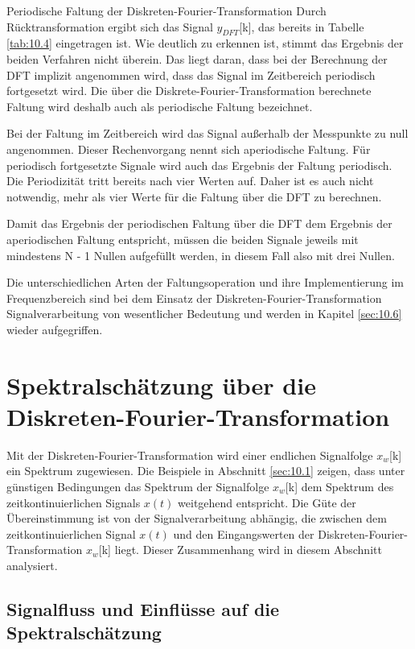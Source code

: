 \begin{example}{Periodische Faltung der Diskreten-Fourier-Transformation}
Durch Rücktransformation ergibt sich das Signal \(y_{DFT}\){[}k{]}, das bereits in Tabelle \ref{tab:10.4} eingetragen ist. Wie deutlich zu erkennen ist, stimmt das Ergebnis der beiden Verfahren nicht überein. Das liegt daran, dass bei der Berechnung der DFT implizit angenommen wird, dass das Signal im Zeitbereich periodisch fortgesetzt wird. Die über die Diskrete-Fourier-Transformation berechnete Faltung wird deshalb auch als periodische Faltung bezeichnet.

Bei der Faltung im Zeitbereich wird das Signal außerhalb der Messpunkte zu null angenommen. Dieser Rechenvorgang nennt sich aperiodische Faltung. Für periodisch fortgesetzte Signale wird auch das Ergebnis der Faltung periodisch. Die Periodizität tritt bereits nach vier Werten auf. Daher ist es auch nicht notwendig, mehr als vier Werte für die Faltung über die DFT zu berechnen.

Damit das Ergebnis der periodischen Faltung über die DFT dem Ergebnis der aperiodischen Faltung entspricht, müssen die beiden Signale jeweils mit mindestens N - 1 Nullen aufgefüllt werden, in diesem Fall also mit drei Nullen.

\end{example}

Die unterschiedlichen Arten der Faltungsoperation und ihre Implementierung im Frequenzbereich sind bei dem Einsatz der Diskreten-Fourier-Transformation Signalverarbeitung von wesentlicher Bedeutung und werden in Kapitel \ref{sec:10.6} wieder aufgegriffen.

\section{Spektralschätzung über die Diskreten-Fourier-Transformation}\label{sec:10.3}

Mit der Diskreten-Fourier-Transformation wird einer endlichen Signalfolge \(x_{w}\){[}k{]} ein Spektrum zugewiesen. Die Beispiele in Abschnitt \ref{sec:10.1} zeigen, dass unter günstigen Bedingungen das Spektrum der Signalfolge \(x_{w}\){[}k{]} dem Spektrum des zeitkontinuierlichen Signals \(x(t)\) weitgehend entspricht. Die Güte der Übereinstimmung ist von der Signalverarbeitung abhängig, die zwischen dem zeitkontinuierlichen Signal \(x(t)\) und den Eingangswerten der Diskreten-Fourier-Transformation \(x_{w}\){[}k{]} liegt. Dieser Zusammenhang wird in diesem Abschnitt analysiert.

\subsection{Signalfluss und Einflüsse auf die Spektralschätzung}\label{sec:signalfluss-und-einfluxfcsse-auf-die-spektralschuxe4tzung}


